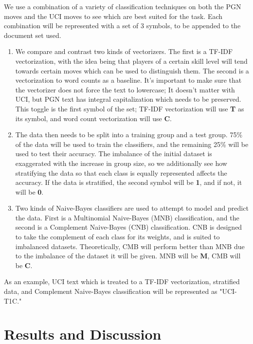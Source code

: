 \documentclass[conference]{IEEEtran}
\begin{document}
We use a combination of a variety of classification techniques on both the PGN moves and the UCI moves to see which are best suited for the task. Each combination will be represented with a set of 3 symbols, to be appended to the document set used.
\begin{enumerate}
\item We compare and contrast two kinds of vectorizers. The first is a TF-IDF vectorization, with the idea being that players of a certain skill level will tend towards certain moves which can be used to distinguish them. The second is a vectorization to word counts as a baseline. It's important to make sure that the vectorizer does not force the text to lowercase; It doesn't matter with UCI, but PGN text has integral capitalization which needs to be preserved. This toggle is the first symbol of the set; TF-IDF vectorization will use \textbf{T} as its symbol, and word count vectorization will use \textbf{C}.
\item The data then needs to be split into a training group and a test group. 75\% of the data will be used to train the classifiers, and the remaining 25\% will be used to test their accuracy. The imbalance of the initial dataset is exaggerated with the increase in group size, so we additionally see how stratifying the data so that each class is equally represented affects the accuracy. If the data is stratified, the second symbol will be \textbf{1}, and if not, it will be \textbf{0}.
\item Two kinds of Naive-Bayes classifiers are used to attempt to model and predict the data. First is a Multinomial Naive-Bayes (MNB) classification, and the second is a Complement Naive-Bayes (CNB) classification. CNB is designed to take the complement of each class for its weights, and is suited to imbalanced datasets. Theoretically, CMB will perform better than MNB due to the imbalance of the dataset it will be given. MNB will be \textbf{M}, CMB will be \textbf{C}.
\end{enumerate}

As an example, UCI text which is treated to a TF-IDF vectorization, stratified data, and Complement Naive-Bayes classification will be represented as "UCI-T1C."

\section{Results and Discussion}
\end{document}
